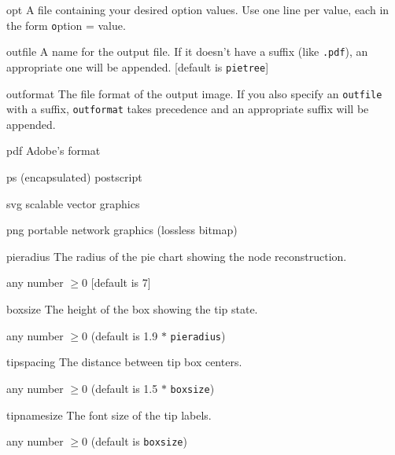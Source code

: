 \documentclass[10pt]{article}
\begin{document}
\begin{optdescrip}

	\item[opt] A file containing your desired option values.  Use one line per value, each in the form {\texttt option = value}.

	\item[outfile] A name for the output file.  If it doesn't have a suffix (like \texttt{.pdf}), an appropriate one will be appended. [default is \texttt{pietree}]

	\item[outformat] The file format of the output image.  If you also specify an \texttt{outfile} with a suffix, \texttt{outformat} takes precedence and an appropriate suffix will be appended.
		\begin{valdescrip}
			\item[pdf] Adobe's format
			\item[ps]  (encapsulated) postscript
			\item[svg] scalable vector graphics
			\item[png] portable network graphics (lossless bitmap)
		\end{valdescrip}


	\item[pieradius] The radius of the pie chart showing the node reconstruction.
		\begin{valdescrip}
			\item[] any number $\ge 0$ [default is 7]
		\end{valdescrip}

	\item[boxsize] The height of the box showing the tip state.
		\begin{valdescrip}
			\item[] any number $\ge 0$ (default is 1.9 $*$ \texttt{pieradius})
		\end{valdescrip}

	\item[tipspacing] The distance between tip box centers.
		\begin{valdescrip}
			\item[] any number $\ge 0$ (default is 1.5 $*$ \texttt{boxsize})
		\end{valdescrip}

	\item[tipnamesize] The font size of the tip labels.
		\begin{valdescrip}
			\item[]  any number $\ge 0$ (default is \texttt{boxsize})
		\end{valdescrip}


\end{optdescrip}
\end{document}
